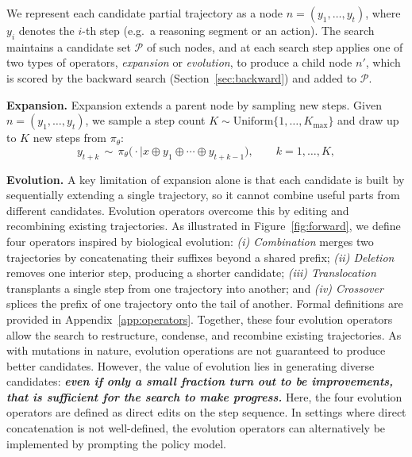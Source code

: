 We represent each candidate partial trajectory as a node
$n=(y_1,\dots,y_{t})$, where $y_i$ denotes the $i$-th step (e.g.\ a reasoning segment or an action). The search maintains a candidate set $\mathcal{P}$ of such nodes, and at
each search step applies one of two types of operators, \emph{expansion}
or \emph{evolution}, to produce a child node $n'$, which is scored by
the backward search (Section~\ref{sec:backward}) and added to $\mathcal{P}$.


\textbf{Expansion.}
Expansion extends a parent node by sampling new steps. Given
$n=(y_1,\dots,y_{t})$, we sample a step count
$K\sim\mathrm{Uniform}\{1,\dots,K_{\max}\}$ and draw up to $K$ new steps from
$\pi_\theta$:
\begin{equation}
  y_{t+k}\,\sim\,\pi_\theta\bigl(\cdot\mid x\oplus y_1\oplus\cdots\oplus y_{t+k-1}\bigr),
  \qquad k=1,\dots,K,
  \label{eq:expand}
\end{equation}

\textbf{Evolution.} 
 A key limitation of expansion alone is that each candidate
is built by sequentially extending a single trajectory,
so it cannot combine useful parts from different candidates.
Evolution operators overcome this by editing and recombining
existing trajectories. As illustrated in Figure~\ref{fig:forward}, we define four operators inspired by biological evolution: \textit{(i) Combination} merges two trajectories by concatenating their suffixes beyond a shared prefix; \textit{(ii) Deletion} removes one interior step, producing a shorter candidate; \textit{(iii) Translocation} transplants a single step from one trajectory into another; and \textit{(iv) Crossover} splices the prefix of one trajectory onto the tail of another. Formal definitions are provided in Appendix~\ref{app:operators}. 
Together, these four evolution operators allow the search to restructure, condense, and recombine existing trajectories. As with mutations in nature, evolution operations are not guaranteed to produce better candidates. However, the value of evolution lies in generating diverse candidates: \textbf{\textit{even if only a small fraction turn out to be improvements, that is sufficient for the search to make progress.}}
Here, the four evolution operators are defined as direct edits on the step sequence. In settings where direct concatenation is not well-defined, the evolution operators can alternatively be implemented by prompting the policy model.


